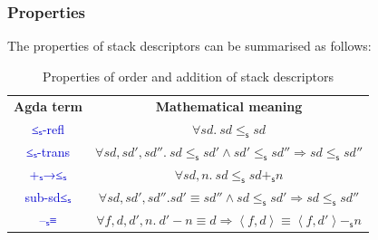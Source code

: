 \documentclass[12pt,a4paper]{report}
\theoremstyle{definition}
\newcommand{\mb}[1]{\textcolor{mediumblue}{#1}}
\newcommand{\mbt}[1]{\mb{\textsf{#1}}}
\newcommand{\ang}[1]{\left\langle #1 \right\rangle}
\begin{document}
    \subsubsection{Properties}
    The properties of stack descriptors can be summarised as follows:
    \begin{table}[H]
        \centering
        \begin{tabular}{|c|c|}
            \hline
            \textbf{Agda term} & \textbf{Mathematical meaning} \\
            \hhline{|=|=|}
            \mbt{≤ₛ-refl} & $\forall sd.\ sd \leq_\mathsf{s} sd$ \\
            \hline
            \mbt{≤ₛ-trans} & $\forall sd, sd', sd''.\ sd \leq_\mathsf{s} sd' \land sd' \leq_\mathsf{s} sd'' \Rightarrow sd \leq_\mathsf{s} sd''$ \\
            \hline
            \mbt{+ₛ→≤ₛ} & $\forall sd, n.\ sd \leq_\mathsf{s} sd +_\mathsf{s} n$ \\
            \hline
            \mbt{sub-sd≤ₛ} & $\forall sd, sd', sd''. sd' \equiv sd'' \land sd \leq_\mathsf{s} sd' \Rightarrow sd \leq_\mathsf{s} sd''$ \\
            \hline
            \mbt{–ₛ≡} & $\forall f, d, d′, n.\ d′ - n \equiv d \Rightarrow \ang{f, d} \equiv \ang{f, d′} -_\mathsf{s} n$ \\
            \hline
        \end{tabular}
        \caption{Properties of order and addition of stack descriptors}
        \label{tab: stack_descriptor_properties}
    \end{table}
\end{document}
